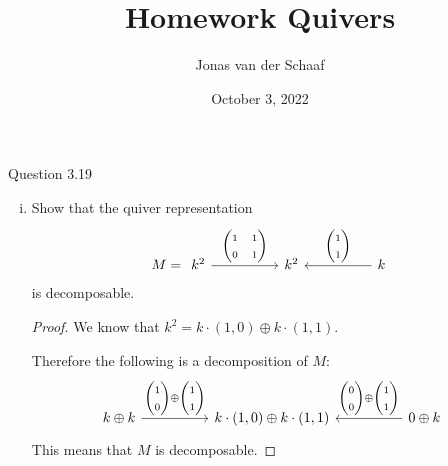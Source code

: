 \documentclass{article}
\title{Homework Quivers}
\author{Jonas van der Schaaf}
\date{October 3, 2022}
\newenvironment{question}[1][]{\begin{paragraph}{Question #1}}{\end{paragraph}}
\theoremstyle{definition}
\begin{document}
\maketitle

\begin{question}[3.19]
    \begin{enumerate}[(i)]
        \item Show that the quiver representation
              \[
                  M=\begin{tikzcd}[ampersand replacement=\&]
                      {k^{2}} \&\& {k^{2}} \&\& k
                      \arrow["{\begin{pmatrix}1&1\\0&1\end{pmatrix}}", from=1-1, to=1-3]
                      \arrow["{\begin{pmatrix}1\\1\end{pmatrix}}"', from=1-5, to=1-3]
                  \end{tikzcd}
              \]
              is decomposable.

              \begin{proof}
                  We know that \(k^{2}=k\cdot(1,0)\oplus k\cdot(1,1)\).

                  Therefore the following is a decomposition of \(M\):
                  \[
                      \begin{tikzcd}[ampersand replacement=\&]
                          {k\oplus k} \&\& {k\cdot(1,0)\oplus k\cdot(1,1)} \&\& 0\oplus k
                          \arrow["{\begin{pmatrix}1\\0\end{pmatrix}\oplus\begin{pmatrix}1\\1\end{pmatrix}}", from=1-1, to=1-3]
                          \arrow["{\begin{pmatrix}0\\0\end{pmatrix}\oplus\begin{pmatrix}1\\1\end{pmatrix}}"', from=1-5, to=1-3]
                      \end{tikzcd}
                  \]
                  This means that \(M\) is decomposable.
              \end{proof}


\end{enumerate}
\end{question}
\end{document}
